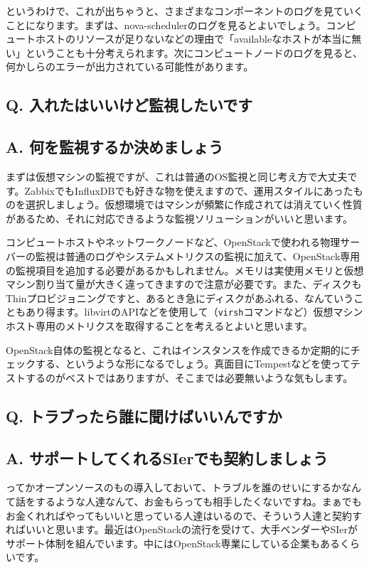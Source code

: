 \documentclass[9pt,b5paper,tombo,openany]{jsbook}
\begin{document}
というわけで、これが出ちゃうと、さまざまなコンポーネントのログを見ていくことになります。まずは、nova-schedulerのログを見るとよいでしょう。コンピュートホストのリソースが足りないなどの理由で「availableなホストが本当に無い」ということも十分考えられます。次にコンピュートノードのログを見ると、何かしらのエラーが出力されている可能性があります。

\subsection*{{\bfseries Q.} 入れたはいいけど監視したいです}
\subsection*{{\bfseries A.} 何を監視するか決めましょう}
まずは仮想マシンの監視ですが、これは普通のOS監視と同じ考え方で大丈夫です。ZabbixでもInfluxDBでも好きな物を使えますので、運用スタイルにあったものを選択しましょう。仮想環境ではマシンが頻繁に作成されては消えていく性質があるため、それに対応できるような監視ソリューションがいいと思います。

コンピュートホストやネットワークノードなど、OpenStackで使われる物理サーバーの監視は普通のログやシステムメトリクスの監視に加えて、OpenStack専用の監視項目を追加する必要があるかもしれません。メモリは実使用メモリと仮想マシン割り当て量が大きく違ってきますので注意が必要です。また、ディスクもThinプロビジョニングですと、あるとき急にディスクがあふれる、なんていうこともあり得ます。libvirtのAPIなどを使用して（\verb|virsh|コマンドなど）仮想マシンホスト専用のメトリクスを取得することを考えるとよいと思います。

OpenStack自体の監視となると、これはインスタンスを作成できるか定期的にチェックする、というような形になるでしょう。真面目にTempestなどを使ってテストするのがベストではありますが、そこまでは必要無いような気もします。

\subsection*{{\bfseries Q.} トラブったら誰に聞けばいいんですか}
\subsection*{{\bfseries A.} サポートしてくれるSIerでも契約しましょう}
ってかオープンソースのもの導入しておいて、トラブルを誰のせいにするかなんて話をするような人達なんて、お金もらっても相手したくないですね。まぁでもお金くれればやってもいいと思っている人達はいるので、そういう人達と契約すればいいと思います。最近はOpenStackの流行を受けて、大手ベンダーやSIerがサポート体制を組んでいます。中にはOpenStack専業にしている企業もあるくらいです。
\end{document}
